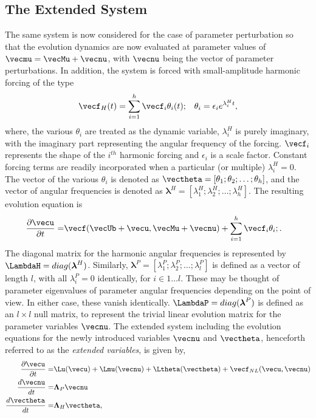 \subsection{The Extended System}
\label{sec:extended}

The same system is now considered for the case of parameter perturbation so that the evolution dynamics are now evaluated at parameter values of $\vecmu = \vecMu + \vecnu$, with $\vecnu$ being the vector of parameter perturbations. In addition, the system is forced with small-amplitude harmonic forcing of the type
\begin{align}
	\label{eqn:harmonic_forcing}
	\vecf_{H}(t) =\sum_{i=1}^{h}\vecf_{i}\theta_{i}(t); && \theta_{i} = \epsilon_{i}e^{\lambda^{H}_{i}t},
\end{align}
where, the various $\theta_{i}$ are treated as the dynamic variable, $\lambda^{H}_{i}$ is purely imaginary, with the imaginary part representing the angular frequency of the forcing. $\vecf_{i}$ represents the shape of the $i^{th}$ harmonic forcing and $\epsilon_{i}$ is a scale factor. Constant forcing terms are readily incorporated when a particular (or multiple) $\lambda^{H}_{i}=0$. The vector of the various $\theta_{i}$ is denoted as $\vectheta = [\theta_{1};\theta_{2};\ldots;\theta_{h}]$, and the vector of angular frequencies is denoted as $\boldsymbol{\lambda}^{H} = [\lambda^{H}_{1};\lambda^{H}_{2};\ldots;\lambda^{H}_{h}]$. The resulting evolution equation is 
\begin{align}
	\frac{\partial \vecu}{\partial t} =& \vecf(\vecUb + \vecu,\vecMu + \vecnu) + \sum_{i=1}^{h}\vecf_{i}\theta_{i}; \nonumber.
\end{align}
The diagonal matrix for the harmonic angular frequencies is represented by $\LambdaH = diag(\boldsymbol{\lambda}^{H})$. Similarly, $\boldsymbol{\lambda}^{P} = [\lambda^{P}_{1};\lambda^{P}_{2};\ldots;\lambda^{P}_{l}]$ is defined as a vector of length $l$, with all $\lambda^{P}_{i} = 0$ identically, for $i\in 1\ldots l$. These may be thought of parameter eigenvalues of parameter angular frequencies depending on the point of view. In either case, these vanish identically. $\LambdaP = diag(\boldsymbol{\lambda}^{P})$ is defined as an $l\times l$ null matrix, to represent the trivial linear evolution matrix for the parameter variables $\vecnu$. The extended system including the evolution equations for the newly introduced variables $\vecnu$ and $\vectheta$, henceforth referred to as the \emph{extended variables}, is given by,
\begin{subequations}
	\begin{align}
			\label{eqn:evolution_extended1}
			\frac{\partial \vecu}{\partial t} =& \Lu(\vecu) + \Lmu(\vecnu) +\Ltheta(\vectheta) + \vecf_{NL}(\vecu,\vecnu) \\
			\label{eqn:evolution_extended2}
			\frac{d \vecnu}{d t} = & \mathbf{\Lambda}_{P}\vecnu \\
			\label{eqn:evolution_extended3}
			\frac{d \vectheta}{d t} = &  \mathbf{\Lambda}_{H}\vectheta, 
	\end{align}
	\label{eqn:evolution_extended}
\end{subequations}
